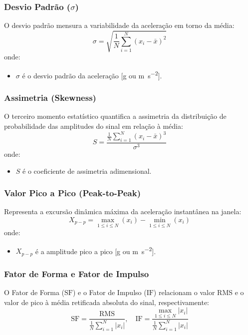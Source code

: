 \subsubsection{Desvio Padrão ($\sigma$)}
O desvio padrão mensura a variabilidade da aceleração em torno da média:
\begin{equation}
    \sigma = \sqrt{\frac{1}{N} \sum_{i=1}^{N} (x_i - \bar{x})^2}
    \label{eq:desvio_padrao}
\end{equation}
onde:
\begin{itemize}
    \item $\sigma$ é o desvio padrão da aceleração [\si{g} ou \si{\meter\per\second\squared}].
\end{itemize}

\subsubsection{Assimetria (Skewness)}
O terceiro momento estatístico quantifica a assimetria da distribuição de probabilidade das amplitudes do sinal em relação à média:
\begin{equation}
    S = \frac{\frac{1}{N} \sum_{i=1}^{N} (x_i - \bar{x})^3}{\sigma^3}
    \label{eq:assimetria}
\end{equation}
onde:
\begin{itemize}
    \item $S$ é o coeficiente de assimetria adimensional.
\end{itemize}

\subsubsection{Valor Pico a Pico (Peak-to-Peak)}
Representa a excursão dinâmica máxima da aceleração instantânea na janela:
\begin{equation}
    X_{p-p} = \max_{1 \le i \le N} (x_i) - \min_{1 \le i \le N} (x_i)
    \label{eq:pico_a_pico}
\end{equation}
onde:
\begin{itemize}
    \item $X_{p-p}$ é a amplitude pico a pico [\si{g} ou \si{\meter\per\second\squared}].
\end{itemize}

\subsubsection{Fator de Forma e Fator de Impulso}
O Fator de Forma ($\text{SF}$) e o Fator de Impulso ($\text{IF}$) relacionam o valor RMS e o valor de pico à média retificada absoluta do sinal, respectivamente:
\begin{equation}
    \text{SF} = \frac{\text{RMS}}{\frac{1}{N} \sum_{i=1}^{N} |x_i|}, \quad \text{IF} = \frac{\max_{1 \le i \le N} |x_i|}{\frac{1}{N} \sum_{i=1}^{N} |x_i|}
    \label{eq:fatores_forma_impulso}
\end{equation}

